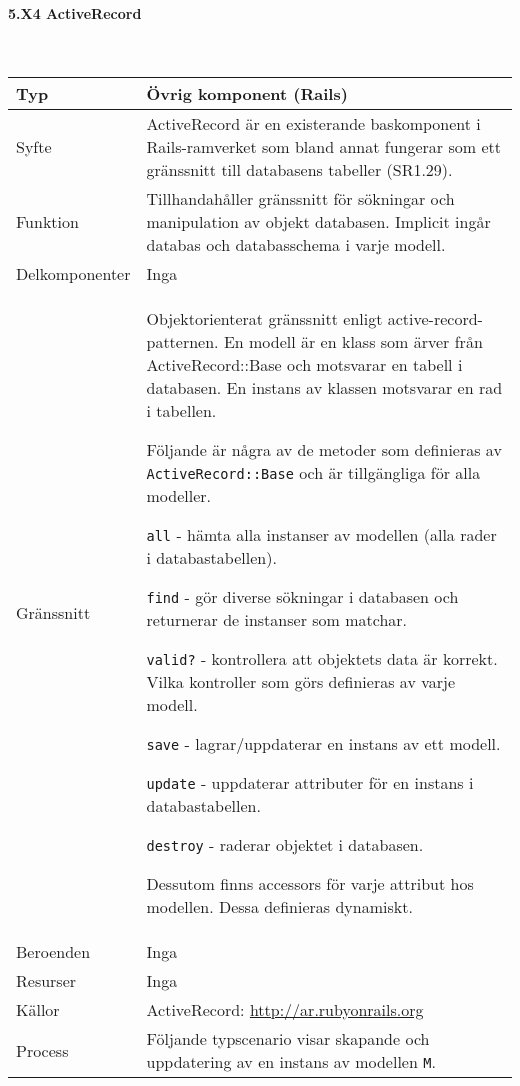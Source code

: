 \documentclass[a4paper, twoside, 11pt, titlepage]{article}
\begin{document}
			\paragraph{5.X4 ActiveRecord}\

			\begin {table} [ht] \begin{tabular} {  p{3.5cm} p{9.6cm} }
				\hline
				{Typ} & {Övrig komponent (Rails)} \\
				\hline
				{Syfte} & {ActiveRecord är en existerande baskomponent i Rails-ramverket som bland annat fungerar som ett gränssnitt till databasens tabeller (SR1.29). } \\
				\hline
				{Funktion} & {Tillhandahåller gränssnitt för sökningar och manipulation av objekt databasen. Implicit ingår databas och databasschema i varje modell.} \\
				\hline
				{Delkomponenter} & { Inga} \\
				\hline
				{Gränssnitt} & {Objektorienterat gränssnitt enligt active-record-patternen. En modell är en klass som ärver från ActiveRecord::Base och motsvarar en tabell i databasen. En instans av klassen motsvarar en rad i tabellen.

Följande är några av de metoder som definieras av {\tt ActiveRecord::Base} och är tillgängliga för alla modeller.

{\tt all} - hämta alla instanser av modellen (alla rader i databastabellen).

{\tt find} - gör diverse sökningar i databasen och returnerar de instanser som matchar.

{\tt valid?} - kontrollera att objektets data är korrekt. Vilka kontroller som görs definieras av varje modell.

{\tt save} - lagrar/uppdaterar en instans av ett modell.

{\tt update} - uppdaterar attributer för en instans i databastabellen.

{\tt destroy} - raderar objektet i databasen.

Dessutom finns accessors för varje attribut hos modellen. Dessa definieras dynamiskt.} \\
				\hline
				{Beroenden} & {Inga} \\
				\hline
				{Resurser} & {Inga} \\
				\hline
				{Källor} & {ActiveRecord: \url{http://ar.rubyonrails.org}} \\
				\hline
				{Process} & {Följande typscenario visar skapande och uppdatering av en instans av modellen {\tt M}.

}
\end{tabular}
\end{table}
\end{document}
